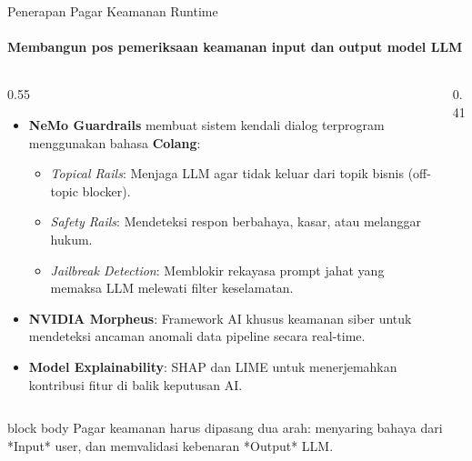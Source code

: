 \documentclass[aspectratio=169,t]{beamer}
\newcommand{\takeaway}[1]{%
  \vspace{0.1em}
  \begin{beamercolorbox}[rounded=true,shadow=false,sep=5pt]{block body}
    \centering\footnotesize\color{nvlightgreen}#1
  \end{beamercolorbox}%
}
\begin{document}
\begin{frame}{Penerapan Pagar Keamanan Runtime}
  \framesubtitle{Membangun pos pemeriksaan keamanan input dan output model LLM}
  \begin{columns}[T]
    \begin{column}{0.55\textwidth}
      \begin{itemize}\footnotesize
        \item \textbf{NeMo Guardrails} membuat sistem kendali dialog terprogram menggunakan bahasa \textbf{Colang}:
          \begin{itemize}\scriptsize
            \item \emph{Topical Rails}: Menjaga LLM agar tidak keluar dari topik bisnis (off-topic blocker).
            \item \emph{Safety Rails}: Mendeteksi respon berbahaya, kasar, atau melanggar hukum.
            \item \emph{Jailbreak Detection}: Memblokir rekayasa prompt jahat yang memaksa LLM melewati filter keselamatan.
          \end{itemize}
        \item \textbf{NVIDIA Morpheus}: Framework AI khusus keamanan siber untuk mendeteksi ancaman anomali data pipeline secara real-time.
        \item \textbf{Model Explainability}: SHAP dan LIME untuk menerjemahkan kontribusi fitur di balik keputusan AI.
      \end{itemize}
    \end{column}
    \begin{column}{0.41\textwidth}
      \begin{center}
      \end{center}
    \end{column}
  \end{columns}
  \takeaway{Pagar keamanan harus dipasang dua arah: menyaring bahaya dari *Input* user, dan memvalidasi kebenaran *Output* LLM.}
\end{frame}
\end{document}
